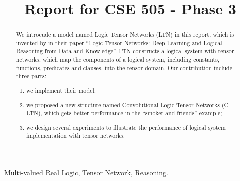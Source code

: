 \documentclass[conference]{IEEEtran}
\begin{document}
%
\title{Report for CSE 505 - Phase 3}


\author{
}

\maketitle


\begin{abstract}
We introcude a model named Logic Tensor Networks (LTN) in this report, which is invented by \cite{serafini2016logic} in their paper ``Logic Tensor Networks: Deep Learning and Logical Reasoning from Data and Knowledge''.
LTN constructs a logical system with tensor networks, which map the components of a logical system, including constants, functions, predicates and clauses, into  the tensor domain.
Our contribution include three parts:
\begin{enumerate}
    \item we implement their model;
    \item we proposed a new structure named Convolutional Logic Tensor Networks (C-LTN), which gets better performance in the ``smoker and friends'' example;
    \item we design several experiments to illustrate the performance of logical system implementation with tensor networks.
\end{enumerate}
\end{abstract}

\begin{IEEEkeywords}
Multi-valued Real Logic, Tensor Network, Reasoning.
\end{IEEEkeywords}
















\end{document}
